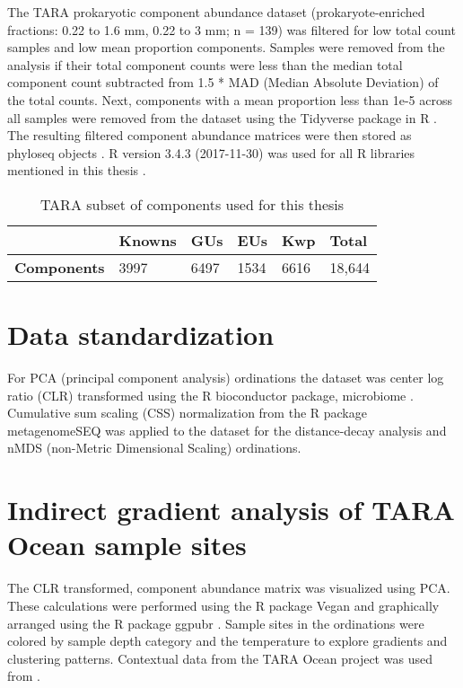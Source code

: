The TARA prokaryotic component abundance dataset (prokaryote-enriched fractions: 0.22 to 1.6 mm, 0.22 to 3 mm; n = 139) was filtered for low total count samples and low mean proportion components. Samples were removed from the analysis if their total component counts were less than the median total component count subtracted from  1.5 * MAD (Median Absolute Deviation) of the total counts. Next, components with a mean proportion less than 1e-5 across all samples were removed from the dataset using the Tidyverse package in R \citep{Wickham_2017}. The resulting filtered component abundance matrices were then stored as phyloseq objects \citep{Oksanen_2017, McMurdie_2013}. R version 3.4.3 (2017-11-30) was used for all R libraries mentioned in this thesis \citep{R}. \\

\begin{table}[H]
\centering
\caption{TARA subset of components used for this thesis}
\label{my-label}
\begin{tabular}{llllll}
\toprule
                    & \textbf{Knowns} & \textbf{GUs} & \textbf{EUs} & \textbf{Kwp} & \textbf{Total} \\
\midrule
\textbf{Components} & 3997            & 6497         & 1534         & 6616         & 18,644        \\
\bottomrule
\end{tabular}
\label{table:table2}
\end{table}

\section{Data standardization}

For PCA (principal component analysis) ordinations the dataset was center log ratio (CLR) transformed \citep{Piepel_1988} using the R bioconductor package, microbiome \citep{Lahti_2017}. Cumulative sum scaling (CSS) normalization from the R package metagenomeSEQ \citep{Paulson_2013} was applied to the dataset for the distance-decay analysis and nMDS (non-Metric Dimensional Scaling) ordinations.\\

\section{Indirect gradient analysis of TARA Ocean sample sites}

The CLR transformed, component abundance matrix was visualized using PCA. These calculations were performed using the R package Vegan \citep{Oksanen_2017} and graphically arranged using the R package ggpubr \citep{Kassambara_2017}. Sample sites in the ordinations were colored by sample depth category and the temperature to explore gradients and clustering patterns. Contextual data from the TARA Ocean project was used from \cite{Sunagawa_2015}.\\

